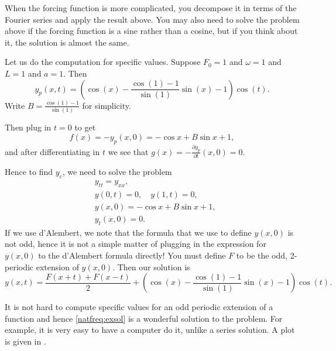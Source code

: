 When the forcing function is more complicated, you decompose it in terms of
the Fourier series and apply the result above.  You may also need to solve
the problem above if the forcing function is a sine rather than a cosine,
but if you think about it, the solution is almost the same.

\begin{example}
Let us do the computation for specific values.
Suppose $F_0 = 1$ and $\omega = 1$ and $L=1$ and $a=1$.  Then 
\begin{equation*}
y_p(x,t) =
\left(
\cos (x) -
\frac{\cos (1) - 1}{\sin (1)}
\sin (x)
-1
\right)
\cos (t) .
\end{equation*}
Write $B = \frac{\cos (1) - 1}{\sin (1)}$ for simplicity.

Then plug in $t=0$ to get
\begin{equation*}
f(x) =- y_p(x,0) = 
- \cos x +
B \sin x
+1 ,
\end{equation*}
and after differentiating in $t$ we see that 
$g(x) = -\frac{\partial y_p}{\partial t}(x,0) = 0$.

Hence to find $y_c$, we need to solve the problem
\begin{align*}
& y_{tt} = y_{xx} , \\
& y(0,t) = 0 , \quad y(1,t) = 0 , \\
& y(x,0) = - \cos x + B \sin x +1 , \\
& y_t(x,0) = 0 .
\end{align*}
If we use d'Alembert, we note that
the formula that we use to define $y(x,0)$ is not odd,
hence it is not a simple matter of plugging in the expression for $y(x,0)$
to the d'Alembert
formula directly!  You must define $F$ to be the odd, 2-periodic
extension of $y(x,0)$.  Then our solution is
\begin{equation} \label{natfreq:exsol}
y(x,t) = 
\frac{F(x+t) + F(x-t)}{2} + 
\left(
\cos (x) -
\frac{\cos (1) - 1}{\sin (1)}
\sin (x)
-1
\right)
\cos (t) .
\end{equation}

It is not hard to compute specific values
for an odd periodic extension of a function and
hence \eqref{natfreq:exsol} is a wonderful solution to the problem.
For example, it is very easy to have a computer do it, unlike a series solution.
A plot is given in .
\begin{myfig}
\capstart
{}
\caption{Plot of $y(x,t) = \frac{F(x+t) + F(x-t)}{2} + \left( \cos (x) -
\frac{\cos (1) - 1}{\sin (1)} \sin (x) -1 \right) \cos (t)$.%
\label{natfreq:forcedvibfig}}
\end{myfig}
\end{example}

